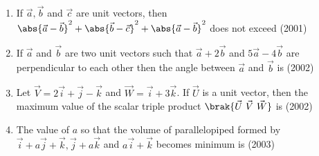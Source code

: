\begin{enumerate}[label=\thesubsection.\arabic*.,ref=\thesubsection.\theenumi]
\begin{enumerate}
\end{enumerate}
\item If $\vec{a},\vec{b}$ and $\vec{c}$ are unit vectors, then \\
$\abs{\vec{a}-\vec{b}}^2+\abs{\vec{b}-\vec{c}}^2+\abs{\vec{a}-\vec{b}}^2$ does not exceed 
\hfill (2001)
\begin{enumerate}
\end{enumerate}
\item If $\vec{a}$ and $\vec{b}$ are two unit vectors such that $\vec{a}+2\vec{b}$ and $5\vec{a}-4\vec{b}$ are perpendicular to each other then the angle between $\vec{a}$ and $\vec{b}$ is 
\hfill (2002)
\begin{enumerate}[itemsep=1ex]
\end{enumerate}
\item Let $\vec{V}= 2\vec{i}+\vec{j}-\vec{k}$ and $\vec{W}= \vec{i}+3\vec{k}$. If $\vec{U}$ is a unit vector, then the maximum value of the scalar triple product $\brak{\vec{U} \ \vec{V} \ \vec{W}}$ is 
\hfill (2002)
\begin{enumerate}
\end{enumerate}
\item The value of $a$ so that the volume of parallelopiped formed by $\vec{i}+a\vec{j}+\vec{k},\vec{j}+a\vec{k}$ and $a\vec{i}+\vec{k}$ becomes minimum is 
\hfill (2003)
\begin{enumerate}
\end{enumerate}
\end{enumerate}
